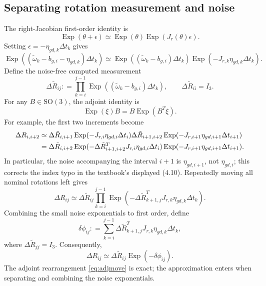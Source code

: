 \documentclass[11pt,a4paper]{article}
\newcommand{\Exp}{\operatorname{Exp}}
\newcommand{\SO}{\mathrm{SO}}
\newcommand{\defeq}{\mathrel{\mathop:}=}
\begin{document}
\subsection{Separating rotation measurement and noise}
The right-Jacobian first-order identity is
\begin{equation}
\Exp(\theta+\epsilon)
\simeq\Exp(\theta)\Exp(J_r(\theta)\epsilon).
\end{equation}
Setting $\epsilon=-\eta_{gd,k}\Delta t_k$ gives
\begin{equation}
\Exp((\tilde\omega_k-b_{g,i}-\eta_{gd,k})\Delta t_k)
\simeq
\Exp((\tilde\omega_k-b_{g,i})\Delta t_k)
\Exp(-J_{r,k}\eta_{gd,k}\Delta t_k).
\end{equation}
Define the noise-free computed measurement
\begin{equation}\label{eq:tildeR}
\boxed{\Delta\tilde R_{ij}\defeq
\prod_{k=i}^{j-1}\Exp((\tilde\omega_k-b_{g,i})\Delta t_k),\qquad
\Delta\tilde R_{ii}=I_3.}
\end{equation}
For any $B\in\SO(3)$, the adjoint identity is
\begin{equation}\label{eq:adjmove}
\Exp(\xi)B=B\Exp(B^T\xi).
\end{equation}
For example, the first two increments become
\begin{align}
\Delta R_{i,i+2}
&\simeq \Delta\tilde R_{i,i+1}
 \Exp(-J_{r,i}\eta_{gd,i}\Delta t_i)
 \Delta\tilde R_{i+1,i+2}
 \Exp(-J_{r,i+1}\eta_{gd,i+1}\Delta t_{i+1})\notag\\
&=\Delta\tilde R_{i,i+2}
 \Exp(-\Delta\tilde R_{i+1,i+2}^{T}J_{r,i}\eta_{gd,i}\Delta t_i)
 \Exp(-J_{r,i+1}\eta_{gd,i+1}\Delta t_{i+1}).
\end{align}
In particular, the noise accompanying the interval $i+1$ is
$\eta_{gd,i+1}$, not $\eta_{gd,i}$; this corrects the index typo
in the textbook's displayed (4.10).
Repeatedly moving all nominal rotations left gives
\begin{equation}
\Delta R_{ij}\simeq\Delta\tilde R_{ij}
\prod_{k=i}^{j-1}
\Exp\!\left(-\Delta\tilde R_{k+1,j}^{T}
J_{r,k}\eta_{gd,k}\Delta t_k\right).
\end{equation}
Combining the small noise exponentials to first order, define
\begin{equation}\label{eq:dphi}
\boxed{\delta\phi_{ij}\defeq
\sum_{k=i}^{j-1}\Delta\tilde R_{k+1,j}^{T}
J_{r,k}\eta_{gd,k}\Delta t_k,}
\end{equation}
where $\Delta\tilde R_{jj}=I_3$. Consequently,
\begin{equation}\label{eq:rotNoise}
\boxed{\Delta R_{ij}\simeq
\Delta\tilde R_{ij}\Exp(-\delta\phi_{ij}).}
\end{equation}
The adjoint rearrangement \eqref{eq:adjmove} is exact; the approximation
enters when separating and combining the noise exponentials.
\end{document}
